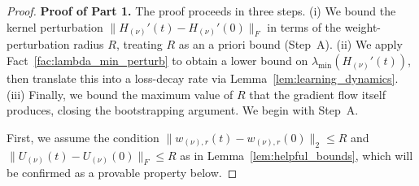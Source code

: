 \documentclass[11pt]{article}
\theoremstyle{plain}
\begin{document}
\begin{proof}
    {\bf Proof of Part 1. }
    The proof proceeds in three steps. (i) We bound the kernel perturbation $\|H_{(\nu)}'(t) - H_{(\nu)}'(0)\|_F$ in terms of the weight-perturbation radius $R$, treating $R$ as an a priori bound (Step~A). (ii) We apply Fact~\ref{fac:lambda_min_perturb} to obtain a lower bound on $\lambda_{\min}(H_{(\nu)}'(t))$, then translate this into a loss-decay rate via Lemma~\ref{lem:learning_dynamics}. (iii) Finally, we bound the maximum value of $R$ that the gradient flow itself produces, closing the bootstrapping argument. We begin with Step~A.

    First, we assume the condition $\| w_{(\nu), r}(t) - w_{(\nu), r}(0) \|_2 \leq R$ and $\| U_{(\nu)}(t) - U_{(\nu)}(0) \|_F \leq R$ as in Lemma~\ref{lem:helpful_bounds}, which will be confirmed as a provable property below.
    

\end{proof}
\end{document}
